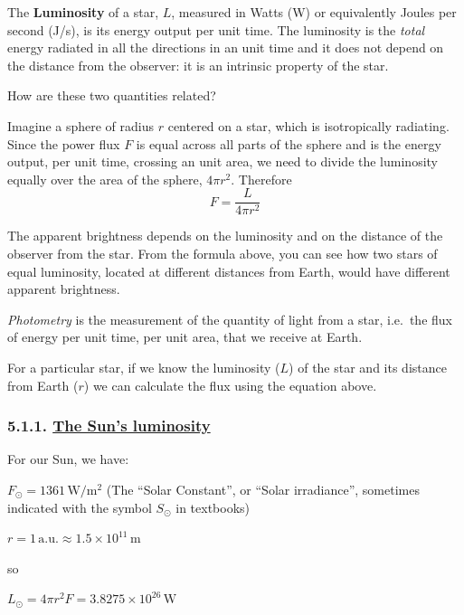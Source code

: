 \documentclass[
  letterpaper,
  DIV=11,
  numbers=noendperiod]{scrartcl}
\begin{document}
The \textbf{Luminosity} of a star, \(L\), measured in Watts (W) or
equivalently Joules per second (J/s), is its energy output per unit
time. The luminosity is the \emph{total} energy radiated in all the
directions in an unit time and it does not depend on the distance from
the observer: it is an intrinsic property of the star.

How are these two quantities related?

Imagine a sphere of radius \(r\) centered on a star, which is
isotropically radiating. Since the power flux \(F\) is equal across all
parts of the sphere and is the energy output, per unit time, crossing an
unit area, we need to divide the luminosity equally over the area of the
sphere, \(4\pi r^2\). Therefore \begin{equation}
F = \frac{L}{4\pi r^2}
\end{equation}

The apparent brightness depends on the luminosity and on the distance of
the observer from the star. From the formula above, you can see how two
stars of equal luminosity, located at different distances from Earth,
would have different apparent brightness.

\emph{Photometry} is the measurement of the quantity of light from a
star, i.e.~the flux of energy per unit time, per unit area, that we
receive at Earth.

For a particular star, if we know the luminosity (\(L\)) of the star and
its distance from Earth (\(r\)) we can calculate the flux using the
equation above.

\hypertarget{the-suns-luminosity}{%
\subsubsection{\texorpdfstring{5.1.1. \protect\hyperlink{toc0_}{The
Sun's
luminosity}}{5.1.1. The Sun's luminosity}}\label{the-suns-luminosity}}

For our Sun, we have:

\(F_\odot = 1361\, \mathrm{W/m^2}\) (The ``Solar Constant'', or ``Solar
irradiance'', sometimes indicated with the symbol \(S_\odot\) in
textbooks)

\(r = 1\, \mathrm{a.u.} \approx 1.5\times 10^{11}\, \mathrm{m}\)

so

\(L_\odot = 4\pi r^2 F = 3.8275 \times 10^{26}\, \mathrm{W}\)
\end{document}
